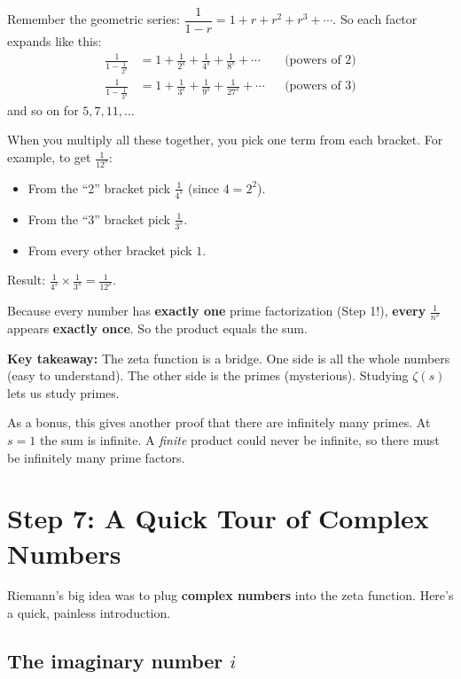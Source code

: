 \documentclass[11pt,a4paper]{article}
\begin{document}
Remember the geometric series: $\dfrac{1}{1-r} = 1 + r + r^2 + r^3 + \cdots$. So each factor expands like this:
\begin{align*}
\frac{1}{1-\frac{1}{2^s}} &= 1 + \frac1{2^s} + \frac1{4^s} + \frac1{8^s} + \cdots && \text{(powers of 2)}\\[4pt]
\frac{1}{1-\frac{1}{3^s}} &= 1 + \frac1{3^s} + \frac1{9^s} + \frac1{27^s} + \cdots && \text{(powers of 3)}
\end{align*}
and so on for $5, 7, 11, \ldots$

When you multiply all these together, you pick one term from each bracket. For example, to get $\frac{1}{12^s}$:
\begin{itemize}[itemsep=1pt]
  \item From the ``2'' bracket pick $\frac1{4^s}$ (since $4 = 2^2$).
  \item From the ``3'' bracket pick $\frac1{3^s}$.
  \item From every other bracket pick $1$.
\end{itemize}
Result: $\frac1{4^s}\times\frac1{3^s} = \frac1{12^s}$.

Because every number has \textbf{exactly one} prime factorization (Step 1!), \textbf{every} $\frac1{n^s}$ appears \textbf{exactly once}. So the product equals the sum.

\begin{keybox}
\textbf{Key takeaway:} The zeta function is a bridge. One side is all the whole numbers (easy to understand). The other side is the primes (mysterious). Studying $\zeta(s)$ lets us study primes.
\end{keybox}

As a bonus, this gives another proof that there are infinitely many primes. At $s = 1$ the sum is infinite. A \emph{finite} product could never be infinite, so there must be infinitely many prime factors.

\section{Step 7: A Quick Tour of Complex Numbers}

Riemann's big idea was to plug \textbf{complex numbers} into the zeta function. Here's a quick, painless introduction.

\subsection*{The imaginary number $i$}
\end{document}
